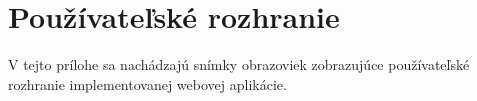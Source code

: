 \chapter {Používateľské rozhranie}
V tejto prílohe sa nachádzajú snímky obrazoviek zobrazujúce používateľské rozhranie implementovanej webovej aplikácie.

